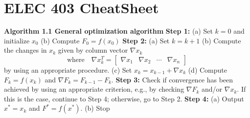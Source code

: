 \chapter{ELEC 403 CheatSheet}
\begin{multicols}{3}

\textbf{Algorithm 1.1 General optimization algorithm} \newline
\textbf{Step 1:} \newline
(a) Set $k=0$ and initialize $x_0$ \newline
(b) Compute $F_0=f(x_0)$ \newline
\textbf{Step 2:} \newline
(a) Set $k=k+1$ \newline
(b) Compute the changes in $x_k$ given by column vector $\nabla x_k$ %
\[ \text{where} \quad 
\nabla x_k^T = \begin{bmatrix}\nabla x_1 & \nabla x_2 & \cdots & \nabla x_n\end{bmatrix}
\]
by using an appropriate procedure. \newline
(c) Set $x_k=x_{k-1}+\nabla x_k$ \newline
(d) Compute $F_k=f(x_k)$ and $\nabla F_k=F_{k-1}-F_k$. \newline
\textbf{Step 3:} \newline
Check if convergence has been achieved by using an appropriate criterion, e.g., by checking $\nabla F_k$ and/or $\nabla x_k$. If this is the case, continue to
Step 4; otherwise, go to Step 2. \newline
\textbf{Step 4:} \newline
(a) Output $x^* = x_k$ and $F^* = f(x^*)$. \newline
(b) Stop

\end{multicols}
